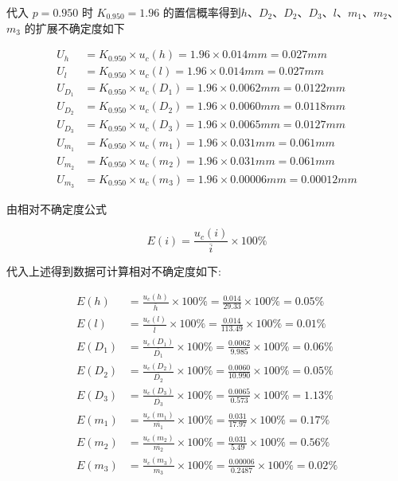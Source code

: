 \documentclass[UTF8]{ctexart}
\begin{document}
\begin{spacing}{1.2}
    代入 $p=0.950$ 时 $K_{0.950} = 1.96$ 的置信概率得到$h$、$D_2$、$D_2$、$D_3$、$l$、$m_1$、$m_2$、$m_3$ 的扩展不确定度如下
\end{spacing}

\begin{align*}
  U_{h} &= K_{0.950} \times u_c(h) = 1.96 \times 0.014mm = 0.027 mm  \\
  U_{l} &= K_{0.950} \times u_c(l) = 1.96 \times0.014 mm =  0.027mm \\
  U_{D_1} &= K_{0.950} \times u_c(D_1) = 1.96 \times 0.0062 mm = 0.0122 mm \\
  U_{D_2} &= K_{0.950} \times u_c(D_2) = 1.96 \times 0.0060 mm = 0.0118 mm \\
  U_{D_3} &= K_{0.950} \times u_c(D_3) = 1.96 \times 0.0065  mm = 0.0127 mm \\
  U_{m_1} &= K_{0.950} \times u_c(m_1) =1.96 \times 0.031 mm = 0.061 mm  \\
  U_{m_2} &= K_{0.950} \times u_c(m_2) = 1.96 \times 0.031 mm = 0.061 mm  \\
  U_{m_3} &= K_{0.950} \times u_c(m_3) = 1.96 \times 0.00006 mm = 0.00012  mm 
\end{align*}

由相对不确定度公式

$$E(i) = \frac{u_c(i)}{\overline{i}} \times 100\% $$

代入上述得到数据可计算相对不确定度如下:

\begin{align*}
    E(h) &= \frac{u_c(h)}{\overline{h}} \times 100\% = \frac{0.014}{29.33} \times 100 \% = 0.05\%\\
    E(l) &= \frac{u_c(l)}{\overline{l}} \times 100\% = \frac{0.014}{113.49} \times 100 \% =0.01\%\\
    E(D_1) &= \frac{u_c(D_1)}{\overline{D_1}} \times 100\% = \frac{0.0062}{9.985} \times 100 \% =0.06\%\\
    E(D_2) &= \frac{u_c(D_2)}{\overline{D_2}} \times 100\% = \frac{0.0060}{10.990} \times 100 \% =0.05\%\\
    E(D_3) &= \frac{u_c(D_3)}{\overline{D_3}} \times 100\% = \frac{0.0065}{0.573} \times 100 \% =1.13\%\\
    E(m_1) &= \frac{u_c(m_1)}{\overline{m_1}} \times 100\% = \frac{0.031}{17.97} \times 100 \% =0.17\%\\
    E(m_2) &= \frac{u_c(m_2)}{\overline{m_2}} \times 100\% = \frac{0.031}{5.49} \times 100 \% =0.56\%\\
    E(m_3) &= \frac{u_c(m_3)}{m_3} \times 100\% = \frac{0.00006}{0.2487} \times 100 \% =0.02\%\\
\end{align*}
\end{document}
